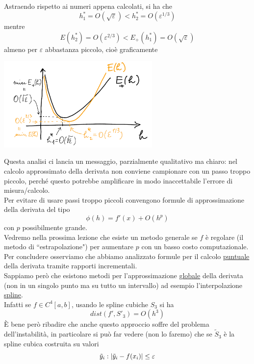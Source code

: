 \documentclass[12pt,a4paper]{article}
\DeclarePairedDelimiter{\abs}{\lvert}{\rvert}
\begin{document}
Astraendo rispetto ai numeri
appena calcolati, si ha che
\[
h_1^* = O(\sqrt{\varepsilon}) < h_2^* = O(\varepsilon^{1/3})
\]
mentre
\[
E(h_2^*) = O(\varepsilon^{2/3}) < E_+(h_1^*) = O(\sqrt{\varepsilon})
\]
almeno per $\varepsilon$ abbastanza piccolo, cioè graficamente
\begin{center}
    \includegraphics[width=0.6\textwidth]{lez17_pag29.png}
\end{center}
Questa analisi ci lancia un messaggio, parzialmente qualitativo ma chiaro: nel calcolo approssimato
della derivata non conviene campionare con un passo troppo piccolo, perché questo potrebbe amplificare in modo inaccettabile l'errore di misura/calcolo.\\
Per evitare di usare passi troppo piccoli convengono formule di approssimazione della derivata del tipo
\[
\phi(h) = f'(x) + O(h^p)
\]
con $p$ possibilmente grande.\\
Vedremo nella prossima lezione che esiste un metodo generale se $f$ è regolare (il metodo di
``estrapolazione") per aumentare $p$ con un basso costo computazionale.\\
Per concludere osserviamo che abbiamo analizzato formule per il calcolo \uline{puntuale} della derivata tramite rapporti incrementali.\\
Sappiamo però che esistono metodi per l'approssimazione \uline{globale} della derivata (non in un singolo punto ma su tutto un intervallo) ad esempio l'interpolazione \uline{spline}.\\
Infatti se $f \in C^4 [a,b]$, usando le spline cubiche $S_3$ si ha
\[
dist(f', S'_3) = O(h^3)
\]
È bene però ribadire che anche questo approccio soffre del problema dell'instabilità, in particolare si può far vedere (non lo faremo) che se $\tilde{S}_3$ è la spline cubica costruita su valori
\[
\tilde{y}_i : \abs{\tilde{y}_i - f(x_i)} \le \varepsilon
\]
\end{document}
